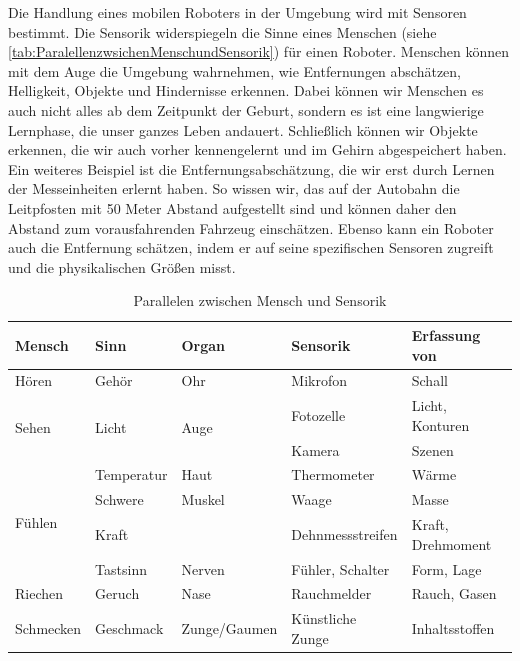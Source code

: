 Die Handlung eines mobilen Roboters in der Umgebung wird mit Sensoren bestimmt. Die Sensorik widerspiegeln die Sinne eines Menschen (siehe \autoref{tab:ParalellenzwsichenMenschundSensorik}) für einen Roboter. Menschen können mit dem Auge die Umgebung wahrnehmen, wie Entfernungen abschätzen, Helligkeit, Objekte und Hindernisse erkennen. Dabei können wir Menschen es auch nicht alles ab dem Zeitpunkt der Geburt, sondern es ist eine langwierige Lernphase, die unser ganzes Leben andauert. Schließlich können wir Objekte erkennen, die wir auch vorher kennengelernt und im Gehirn abgespeichert haben. Ein weiteres Beispiel ist die Entfernungsabschätzung, die wir erst durch Lernen der Messeinheiten erlernt haben. So wissen wir, das auf der Autobahn die Leitpfosten mit 50 Meter Abstand aufgestellt sind und können daher den Abstand zum vorausfahrenden Fahrzeug einschätzen. Ebenso kann ein Roboter auch die Entfernung schätzen, indem er auf seine spezifischen Sensoren zugreift und die physikalischen Größen misst.
\begin{table}[H]
\begin{tabular}{|l|l|l|l|l|}
\hline
\textbf{Mensch}         & \textbf{Sinn}          & \textbf{Organ}        & \textbf{Sensorik} & \textbf{Erfassung von} \\ \hline\hline
Hören                   & Gehör                  & Ohr                   & Mikrofon          & Schall                 \\ \hline
\multirow{2}{*}{Sehen}  & \multirow{2}{*}{Licht} & \multirow{2}{*}{Auge} & Fotozelle         & Licht, Konturen        \\ \cline{4-5} 
                        &                        &                       & Kamera            & Szenen                 \\ \hline
\multirow{4}{*}{Fühlen} & Temperatur             & Haut                  & Thermometer       & Wärme                  \\ \cline{2-5} 
                        & Schwere                & Muskel                & Waage             & Masse                  \\ \cline{2-5} 
                        & Kraft                  &                       & Dehnmessstreifen  & Kraft, Drehmoment      \\ \cline{2-5} 
                        & Tastsinn               & Nerven                & Fühler, Schalter  & Form, Lage             \\ \hline
Riechen                 & Geruch                 & Nase                  & Rauchmelder       & Rauch, Gasen           \\ \hline
Schmecken               & Geschmack              & Zunge/Gaumen          & Künstliche Zunge  & Inhaltsstoffen         \\ \hline
\end{tabular}
\caption{Parallelen zwischen Mensch und Sensorik \cite{SensorenAutomation.2014}}
\label{tab:ParalellenzwsichenMenschundSensorik}
\end{table}
